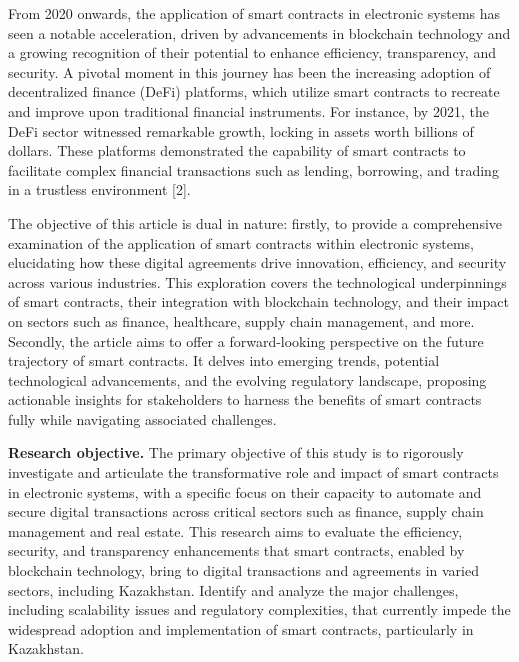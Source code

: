 From 2020 onwards, the application of smart contracts in electronic
systems has seen a notable acceleration, driven by advancements in
blockchain technology and a growing recognition of their potential to
enhance efficiency, transparency, and security. A pivotal moment in this
journey has been the increasing adoption of decentralized finance (DeFi)
platforms, which utilize smart contracts to recreate and improve upon
traditional financial instruments. For instance, by 2021, the DeFi
sector witnessed remarkable growth, locking in assets worth billions of
dollars. These platforms demonstrated the capability of smart contracts
to facilitate complex financial transactions such as lending, borrowing,
and trading in a trustless environment {[}2{]}.

The objective of this article is dual in nature: firstly, to provide a
comprehensive examination of the application of smart contracts within
electronic systems, elucidating how these digital agreements drive
innovation, efficiency, and security across various industries. This
exploration covers the technological underpinnings of smart contracts,
their integration with blockchain technology, and their impact on
sectors such as finance, healthcare, supply chain management, and more.
Secondly, the article aims to offer a forward-looking perspective on the
future trajectory of smart contracts. It delves into emerging trends,
potential technological advancements, and the evolving regulatory
landscape, proposing actionable insights for stakeholders to harness the
benefits of smart contracts fully while navigating associated
challenges.

\textbf{Research objective.} The primary objective of this study is to
rigorously investigate and articulate the transformative role and impact
of smart contracts in electronic systems, with a specific focus on their
capacity to automate and secure digital transactions across critical
sectors such as finance, supply chain management and real estate. This
research aims to evaluate the efficiency, security, and transparency
enhancements that smart contracts, enabled by blockchain technology,
bring to digital transactions and agreements in varied sectors,
including Kazakhstan. Identify and analyze the major challenges,
including scalability issues and regulatory complexities, that currently
impede the widespread adoption and implementation of smart contracts,
particularly in Kazakhstan.

